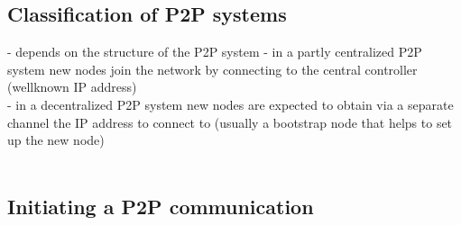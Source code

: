 
\subsection{Classification of \gls{P2P} systems}
\label{sec:p2p_classification}

- depends on the structure of the P2P system
- in a partly centralized P2P system new nodes join the network by connecting to the central controller (wellknown IP address) \\
- in a decentralized P2P system new nodes are expected to obtain via a separate channel the IP address to connect to (usually a bootstrap node that helps to set up the new node) \\
\\


\subsection{Initiating a \gls{P2P} communication}
\label{sec:p2p_start_communication}

